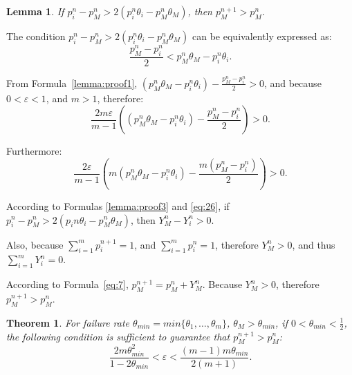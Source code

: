 \documentclass[10pt,journal,cspaper,compsoc,onecolumn]{IEEEtran}
\begin{document}
\newtheorem{lem_appendix}{Lemma}
\label{Lemma_appdendix}
\begin{lem_appendix}
  If $p_i^{n} - p_M^{n} > 2(p_i^{n}\theta_i - p_M^{n}\theta_M)$, then $p_M^{n + 1} > p_M^{n}$.
\end{lem_appendix}
\begin{IEEEproof}
The condition $p_i^{n} - p_M^{n} > 2(p_i^{n}\theta_i - p_M^{n}\theta_M)$ can be equivalently expressed as:
\begin{equation}
  \label{lemma:proof1}
\displaystyle\frac{p_M^n - p_i^n}{2} < p_M^{n}\theta_M - p_i^{n}\theta_i.
\end{equation}

From Formula~\ref{lemma:proof1},  $(p_M^{n}\theta_M - p_i^{n}\theta_i) - \displaystyle\frac{p_M^n - p_i^n}{2} > 0$, and because $0 < \varepsilon < 1$, and $m > 1$,  therefore:
\begin{equation}
  \label{lemma:proof2}
\displaystyle\frac{2m\varepsilon}{m - 1}((p_M^{n}\theta_M - p_i^{n}\theta_i) - \displaystyle\frac{p_M^n - p_i^n}{2}) > 0.
\end{equation}

Furthermore:
\begin{equation}
  \label{lemma:proof3}
\displaystyle\frac{2\varepsilon}{m - 1}(m(p_M^{n}\theta_M - p_i^{n}\theta_i) - \displaystyle\frac{m(p_M^n - p_i^n)}{2}) > 0.
\end{equation}

According to Formulas \ref{lemma:proof3} and \ref{eq:26},
if $p_i^{n} - p_M^{n} > 2(p_i{n}\theta_i - p_M^{n}\theta_M)$, then
$Y_M^n - Y_i^n > 0$.

Also, because
$\sum_{i=1}^mp_i^{n + 1} = 1$, and
$\sum_{i=1}^mp_i^{n} = 1$, therefore
$Y_M^n >0$, and thus
$\sum_{i=1}^mY_i^n = 0$.

According to Formula~\ref{eq:7},
$p_M^{n + 1} = p_M^n + Y_M^n$.
Because $Y_M^n >0$, therefore
$p_M^{n + 1} > p_M^n$.
\end{IEEEproof}

\newtheorem{my}{Theorem}
\label{theorem}
\begin{my}
  For failure rate $\theta_{min} = min\{\theta_1, \ldots, \theta_m\}$, $\theta_M > \theta_{min}$, if $0 < \theta_{min} < \frac{1}{2}$, the following condition is sufficient to guarantee that $p_M^{n + 1} > p_M^{n}$:
  \begin{equation}
\label{equa:results}
  \displaystyle\frac{2m\theta_{min}^2}{1-2\theta_{min}} < \varepsilon < \displaystyle\frac{(m-1)m\theta_{min}}{2(m + 1)}.
\end{equation}
\end{my}
\end{document}
